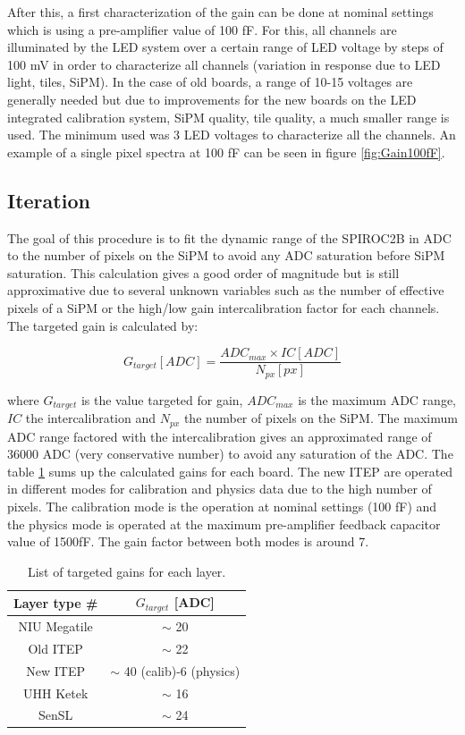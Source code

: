 After this, a first characterization of the gain can be done at nominal settings which is using a pre-amplifier value of 100 fF. For this, all channels are illuminated by the LED system over a certain range of LED voltage by steps of 100 mV in order to characterize all channels (variation in response due to LED light, tiles, SiPM). In the case of old boards, a range of 10-15 voltages are generally needed but due to improvements for the new boards on the LED integrated calibration system, SiPM quality, tile quality, a much smaller range is used. The minimum used was 3 LED voltages to characterize all the channels. An example of a single pixel spectra at 100 fF can be seen in figure \ref{fig:Gain100fF}.

\subsection{Iteration}

The goal of this procedure is to fit the dynamic range of the SPIROC2B in ADC to the number of pixels on the SiPM to avoid any ADC saturation before SiPM saturation. This calculation gives a good order of magnitude but is still approximative due to several unknown variables such as the number of effective pixels of a SiPM or the high/low gain intercalibration factor for each channels. The targeted gain is calculated by:

\begin{equation}
  G_{target} [ADC] = \frac{ADC_{max} \times IC [ADC]}{N_{px} [px]}
\end{equation}

where $G_{target}$ is the value targeted for gain, $ADC_{max}$ is the maximum ADC range, $IC$ the intercalibration and $N_{px}$ the number of pixels on the SiPM. The maximum ADC range factored with the intercalibration gives an approximated range of 36000 ADC (very conservative number) to avoid any saturation of the ADC. The table \ref{table:GainTarget_SiPM} sums up the calculated gains for each board. The new ITEP are operated in different modes for calibration and physics data due to the high number of pixels. The calibration mode is the operation at nominal settings (100 fF) and the physics mode is operated at the maximum pre-amplifier feedback capacitor value of 1500fF. The gain factor between both modes is around 7.

\begin{table}[htb!]
  \centering
  \caption{List of targeted gains for each layer.}
  \label{table:GainTarget_SiPM}
  \begin{tabular}{@{} cc @{}}
    \hline
    Layer type \# & $G_{target}$ [ADC] \\
    \hline
    NIU Megatile & $\sim$ 20\\
    Old ITEP & $\sim$ 22\\
    New ITEP & $\sim$ 40 (calib)-6 (physics)\\
    UHH Ketek & $\sim$ 16\\
    SenSL & $\sim$ 24\\
    \hline
  \end{tabular}
\end{table}

